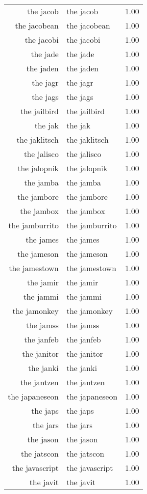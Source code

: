 \begin{table}[ht]
\begin{tabular}{rlr}
  the jacob & the jacob & 1.00 \\ 
  the jacobean & the jacobean & 1.00 \\ 
  the jacobi & the jacobi & 1.00 \\ 
  the jade & the jade & 1.00 \\ 
  the jaden & the jaden & 1.00 \\ 
  the jagr & the jagr & 1.00 \\ 
  the jags & the jags & 1.00 \\ 
  the jailbird & the jailbird & 1.00 \\ 
  the jak & the jak & 1.00 \\ 
  the jaklitsch & the jaklitsch & 1.00 \\ 
  the jalisco & the jalisco & 1.00 \\ 
  the jalopnik & the jalopnik & 1.00 \\ 
  the jamba & the jamba & 1.00 \\ 
  the jambore & the jambore & 1.00 \\ 
  the jambox & the jambox & 1.00 \\ 
  the jamburrito & the jamburrito & 1.00 \\ 
  the james & the james & 1.00 \\ 
  the jameson & the jameson & 1.00 \\ 
  the jamestown & the jamestown & 1.00 \\ 
  the jamir & the jamir & 1.00 \\ 
  the jammi & the jammi & 1.00 \\ 
  the jamonkey & the jamonkey & 1.00 \\ 
  the jamss & the jamss & 1.00 \\ 
  the janfeb & the janfeb & 1.00 \\ 
  the janitor & the janitor & 1.00 \\ 
  the janki & the janki & 1.00 \\ 
  the jantzen & the jantzen & 1.00 \\ 
  the japaneseon & the japaneseon & 1.00 \\ 
  the japs & the japs & 1.00 \\ 
  the jars & the jars & 1.00 \\ 
  the jason & the jason & 1.00 \\ 
  the jatscon & the jatscon & 1.00 \\ 
  the javascript & the javascript & 1.00 \\ 
  the javit & the javit & 1.00 \\ 

\end{tabular}
\end{table}
